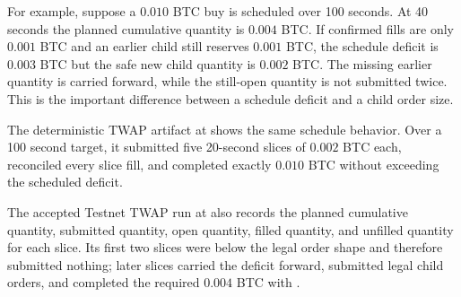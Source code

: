 For example, suppose a \(0.010\) BTC buy is scheduled over 100 seconds. At 40 seconds the planned cumulative quantity is \(0.004\) BTC. If confirmed fills are only \(0.001\) BTC and an earlier child still reserves \(0.001\) BTC, the schedule deficit is \(0.003\) BTC but the safe new child quantity is \(0.002\) BTC. The missing earlier quantity is carried forward, while the still-open quantity is not submitted twice. This is the important difference between a schedule deficit and a child order size.

The deterministic TWAP artifact at  shows the same schedule behavior. Over a 100 second target, it submitted five 20-second slices of \(0.002\) BTC each, reconciled every slice fill, and completed exactly \(0.010\) BTC without exceeding the scheduled deficit.

The accepted Testnet TWAP run at  also records the planned cumulative quantity, submitted quantity, open quantity, filled quantity, and unfilled quantity for each slice. Its first two slices were below the legal order shape and therefore submitted nothing; later slices carried the deficit forward, submitted legal child orders, and completed the required \(0.004\) BTC with .
